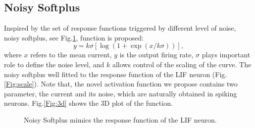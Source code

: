 \documentclass[runningheads,a4paper]{llncs}
\begin{document}
\subsection{Noisy Softplus}
Inspired by the set of response functions triggered by different level of noise, noisy softplus, see Fig.\ref{fig:nsp}, function is proposed:
\begin{equation}
y = k \sigma [\log (1 + \exp(x/k \sigma))],
\label{equ:nsp}
\end{equation}
where $x$ refers to the mean current, $y$ is the output firing rate, $\sigma$ plays important role to define the noise level, and $k$ allows control of the scaling of the curve. 
The noisy softplus well fitted to the response function of the LIF neuron (Fig.\ref{Fig:scale}).
Note that, the novel activation function we propose contains two parameter, the current and its noise, which are naturally obtained in spiking neurons.
Fig.\ref{Fig:3d} shows the 3D plot of the function.
\begin{figure}[bt!]
	\centering
	\caption{
	Noisy Softplus mimics the response function of the LIF neuron.}
	\label{fig:nsp}
\end{figure}
\end{document}
